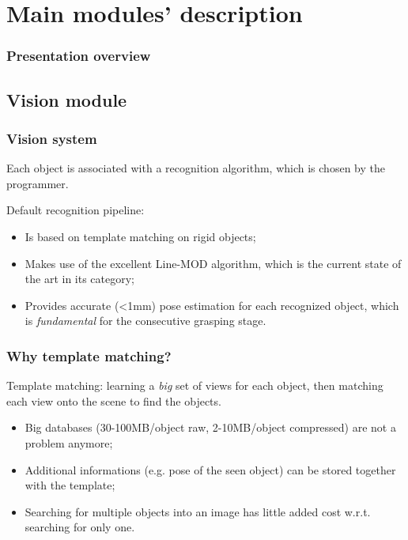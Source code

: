 \documentclass{beamer}
\begin{document}
  \section{Main modules' description}
  \begin{frame}
    \frametitle{Presentation overview}
    \tableofcontents[currentsection]
  \end{frame}
  \subsection{Vision module}
  \begin{frame}
    \frametitle{Vision system}
    Each object is associated with a recognition algorithm, which is
    chosen by the programmer.

    Default recognition pipeline:
    \begin{itemize}
    \item{Is based on template matching on rigid objects;}
    \item{Makes use of the excellent Line-MOD algorithm, which is
      the current state of the art in its category;}
    \item{Provides accurate (\textless 1mm) pose estimation for each
      recognized object, which is \emph{fundamental} for the
      consecutive grasping stage.}
    \end{itemize}
  \end{frame}
  \begin{frame}
    \frametitle{Why template matching?}
    Template matching: learning a \emph{big} set of views for each object, then
    matching each view onto the scene to find the objects.

    \begin{itemize}
    \item{Big databases (30-100MB/object raw, 2-10MB/object
      compressed) are not a problem anymore;}
    \item{Additional informations (e.g. pose of the seen object) can
      be stored together with the template;}
    \item{Searching for multiple objects into an image has little
      added cost w.r.t. searching for only one.}      
    \end{itemize}
  \end{frame}
\end{document}
